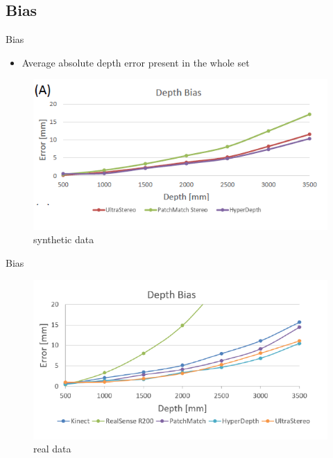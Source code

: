 \subsection{Bias}
\begin{frame}{Bias}
\begin{itemize}
\item Average absolute depth error present in the whole set
\end{itemize}
\begin{figure}
\centering
\includegraphics[scale=1]{pictures/fig3_depth_Bias_synthetic_data}
\caption{synthetic data}
\end{figure}
\end{frame}

\begin{frame}{Bias}
\begin{figure}
\centering
\includegraphics[scale=1]{pictures/fig_4_depth_bias_real_data}
\caption{real data}
\end{figure}
\end{frame}


